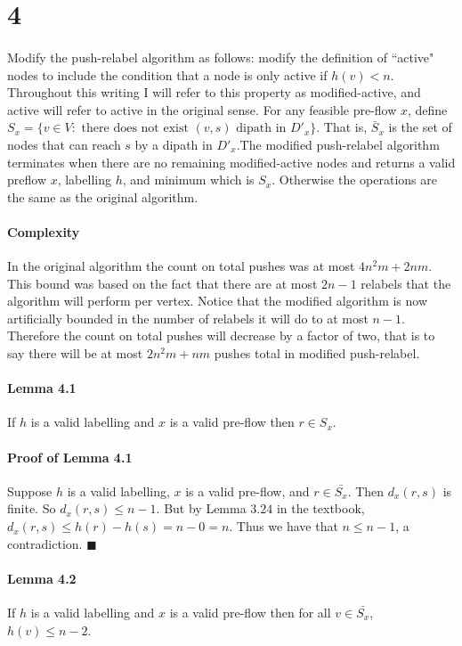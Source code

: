 \documentclass[letterpaper,12pt,oneside,onecolumn]{article}
\begin{document}
\section*{4}
\paragraph{}
Modify the push-relabel algorithm as follows: modify the definition of ``active" nodes to include the condition that a node is only active if $h(v) < n$. Throughout this writing I will refer to this property as modified-active, and active will refer to active in the original sense. For any feasible pre-flow $x$, define $S_x = \{ v \in V: \text{ there does not exist } (v,s) \text{ dipath in } D'_x \}$. That is, $\bar{S}_x$ is the set of nodes that can reach $s$ by a dipath in $D'_x$.The modified push-relabel algorithm terminates when there are no remaining modified-active nodes and returns a valid preflow $x$, labelling $h$, and minimum which is $S_x$. Otherwise the operations are the same as the original algorithm.
\paragraph{Complexity}
 In the original algorithm the count on total pushes was at most $4n^2m + 2nm$. This bound was based on the fact that there are at most $2n-1$ relabels that the algorithm will perform per vertex. Notice that the modified algorithm is now artificially bounded in the number of relabels it will do to at most $n-1$. Therefore the count on total pushes will decrease by a factor of two, that is to say there will be at most $2n^2m + nm$ pushes total in modified push-relabel.
\paragraph{Lemma 4.1}
If $h$ is a valid labelling and $x$ is a valid pre-flow then $r \in S_x$.
\paragraph{Proof of Lemma 4.1}
Suppose $h$ is a valid labelling, $x$ is a valid pre-flow, and $r \in \bar{S_x}$. Then $d_x(r,s)$ is finite. So $d_x(r,s) \leq n-1$. But by Lemma $3.24$ in the textbook, $d_x(r,s) \leq h(r) - h(s) = n - 0 = n$. Thus we have that $n \leq n-1$, a contradiction. $\blacksquare$
 \paragraph{Lemma 4.2}
 If $h$ is a valid labelling and $x$ is a valid pre-flow then for all $v \in \bar{S_x}$, $h(v) \leq n-2$.
\end{document}
